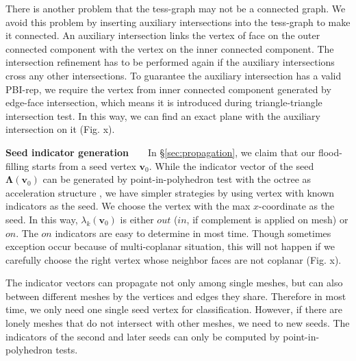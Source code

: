 \documentclass[10pt,journal,compsoc]{IEEEtran}
\begin{document}
\vspace{0.5em}\noindent There is another problem that the tess-graph may not be a connected graph. We avoid this problem by inserting auxiliary intersections into the tess-graph to make it connected. An auxiliary intersection links the vertex of face on the outer connected component with the vertex on the inner connected component. The intersection refinement has to be performed again if the auxiliary intersections cross any other intersections. To guarantee the auxiliary intersection has a valid PBI-rep, we require the vertex from inner connected component generated by edge-face intersection, which means it is introduced during triangle-triangle intersection test. In this way, we can find an exact plane with the auxiliary intersection on it (Fig. x).

\vspace{0.5em}
\noindent\textbf{Seed indicator generation}~~~~In \S\ref{sec:propagation}, we claim that our flood-filling starts from a seed vertex $\bm{v}_0$. While the indicator vector of the seed $\bm{\Lambda}(\bm{v}_0)$ can be generated by point-in-polyhedron test \cite{ogayar2005point} with the octree as acceleration structure \cite{frisken2002simple}, we have simpler strategies by using vertex with known indicators as the seed. We choose the vertex with the max $x$-coordinate as the seed. In this way, $\lambda_k(\bm{v}_0)$ is either $out$ ($in$, if complement is applied on mesh) or $on$. The $on$ indicators are easy to determine in most time. Though sometimes exception occur because of multi-coplanar situation, this will not happen if we carefully choose the right vertex whose neighbor faces are not coplanar (Fig. x).

\vspace{0.5em}\noindent The indicator vectors can propagate not only among single meshes, but can also between different meshes by the vertices and edges they share. Therefore in most time, we only need one single seed vertex for classification. However, if there are lonely meshes that do not intersect with other meshes, we need to new seeds. The indicators of the second and later seeds can only be computed by point-in-polyhedron tests.

\end{document}

